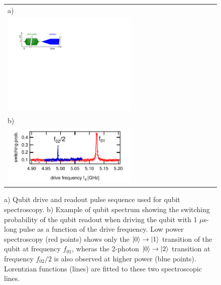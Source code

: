 \begin{figure}[h!]
\begin{center}
\begin{tabular}{l}
a) \\ \includegraphics[width=0.6\textwidth]{"./material/figures/measurement/qubit_spectroscopy"} \\
b) \\ \includegraphics[width=0.6\textwidth]{"./data/ct5/2011_04_21 - grover and tomo/example - qubit 2 spectroscopy"} \\
\end{tabular}
\end{center}
\caption[]{a) Qubit drive and readout pulse sequence used for qubit spectroscopy. b) Example of qubit spectrum showing the switching probability of the qubit readout when driving the qubit with 1 $\mu$s-long pulse as a function of the drive frequency. Low power spectroscopy (red points) shows only the $\left| 0 \right>\to\left| 1 \right>$ transition of the qubit at frequency $f_{01}$, wheras the 2-photon $\left| 0 \right>\to\left| 2 \right>$ transition at frequency $f_{02}/2$ is also observed at higher power (blue points). Lorentzian functions (lines) are fitted to these two spectroscopic lines.}
\label{fig:qubit_spectroscopy_example}
\end{figure}

